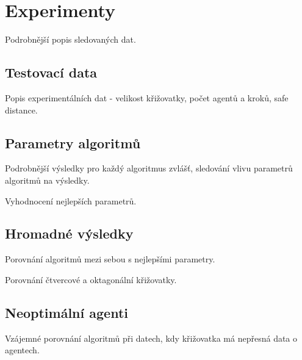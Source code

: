\chapter{Experimenty}\label{ch:experimenty}

Podrobnější popis sledovaných dat.


\section{Testovací data}\label{sec:testovaci_data}

Popis experimentálních dat - velikost křižovatky, počet agentů a kroků, safe distance.


\section{Parametry algoritmů}\label{sec:parametry_algoritmu}

Podrobnější výsledky pro každý algoritmus zvlášť, sledování vlivu parametrů algoritmů na výsledky.

Vyhodnocení nejlepších parametrů.


\section{Hromadné výsledky}\label{sec:hromadne_vysledky}

Porovnání algoritmů mezi sebou s nejlepšími parametry.

Porovnání čtvercové a oktagonální křižovatky.


\section{Neoptimální agenti}\label{sec:neoptimalni_agenti}

Vzájemné porovnání algoritmů při datech, kdy křižovatka má nepřesná data o agentech.
